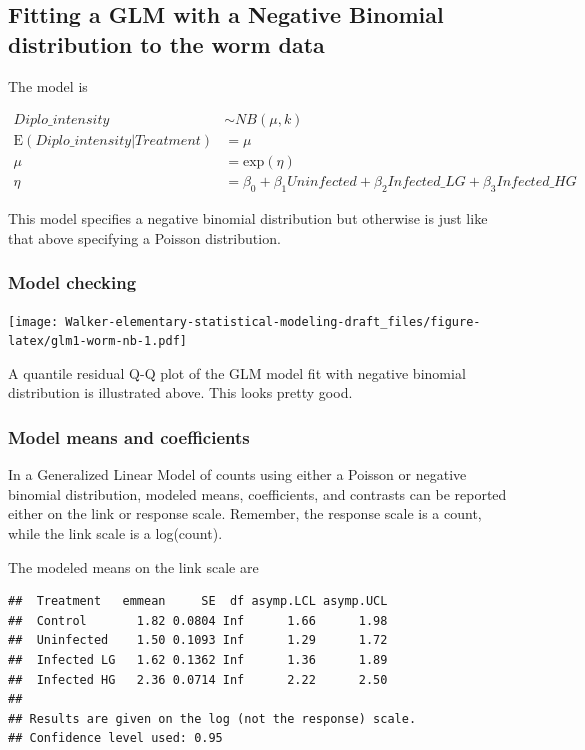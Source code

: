 \documentclass[]{book}
\begin{document}
\subsection{Fitting a GLM with a Negative Binomial distribution to the
worm
data}\label{fitting-a-glm-with-a-negative-binomial-distribution-to-the-worm-data}

The model is

\begin{align}
Diplo\_intensity &\sim NB(\mu, k)\\
\mathrm{E}({Diplo\_intensity|Treatment}) &= \mu\\
\mu &= \mathrm{exp}(\eta)\\
\eta &= \beta_0 + \beta_1 Uninfected + \beta_2 Infected\_LG + \beta_3 Infected\_HG
\end{align}

This model specifies a negative binomial distribution but otherwise is
just like that above specifying a Poisson distribution.

\subsubsection{Model checking}\label{model-checking-1}

\texttt{[image: Walker-elementary-statistical-modeling-draft\_files/figure-latex/glm1-worm-nb-1.pdf]}

A quantile residual Q-Q plot of the GLM model fit with negative binomial
distribution is illustrated above. This looks pretty good.

\subsubsection{Model means and
coefficients}\label{model-means-and-coefficients}

In a Generalized Linear Model of counts using either a Poisson or
negative binomial distribution, modeled means, coefficients, and
contrasts can be reported either on the link or response scale.
Remember, the response scale is a count, while the link scale is a
log(count).

The modeled means on the link scale are

\begin{verbatim}
##  Treatment   emmean     SE  df asymp.LCL asymp.UCL
##  Control       1.82 0.0804 Inf      1.66      1.98
##  Uninfected    1.50 0.1093 Inf      1.29      1.72
##  Infected LG   1.62 0.1362 Inf      1.36      1.89
##  Infected HG   2.36 0.0714 Inf      2.22      2.50
## 
## Results are given on the log (not the response) scale. 
## Confidence level used: 0.95
\end{verbatim}
\end{document}
